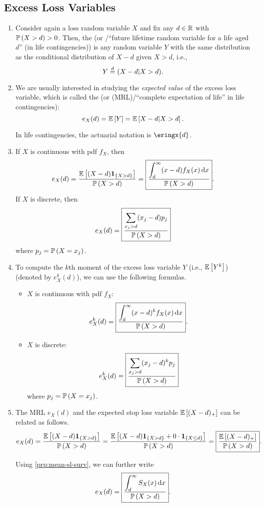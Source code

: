 \subsection{Excess Loss Variables}
\begin{enumerate}
\item Consider again a loss random variable \(X\) and fix any \(d\in\mathbb{R}\) with
\(\mathbb{P}\left(X>d\right)>0\). Then, the  (or /``future lifetime random variable for a life aged \(d\)'' (in life
contingencies)) is any random variable \(Y\) with the same distribution
as the conditional distribution of \(X-d\) given \(X>d\), i.e.,
\[
Y\overset{d}= (X-d|X>d).
\]
\item We are usually interested in studying the \emph{expected value} of the
excess loss variable, which is called the  (or
 (MRL)/``complete expectation of life'' in life
contingencies):
\[
e_{X}(d)=\mathbb{E}\left[Y\right]=\mathbb{E}\left[X-d|X>d\right].
\]
\begin{note}
In life contingencies, the actuarial notation is \(\eringx{d}\).
\end{note}
\item \label{it:mrl-fmlas}
If \(X\) is continuous with pdf \(f_X\), then
\[
e_X(d)=\frac{\mathbb{E}\left[(X-d)\mathbf{1}_{\left\{X>d\right\}}\right]}{\mathbb{P}\left(X>d\right)}
=\boxed{\frac{\displaystyle\int_{d}^{\infty}(x-d)f_X(x)\dd{x}}{\mathbb{P}\left(X>d\right)}}.
\]
If \(X\) is discrete, then
\[
e_X(d)=\boxed{\frac{\displaystyle \sum_{x_j>d}^{}(x_j-d)p_j}{\mathbb{P}\left(X>d\right)}}
\]
where \(p_j=\mathbb{P}\left(X=x_j\right)\).

\item \label{it:ex-loss-kth-moment-fmlas}
To compute the \(k\)th moment of the excess loss variable \(Y\) (i.e.,
\(\mathbb{E}\left[Y^k\right]\)) (denoted by \(e_X^{k}(d)\)), we can use the following formulas.
\begin{itemize}
\item \(X\) is continuous with pdf \(f_X\):
\[
e_X^{k}(d)=\boxed{\frac{\displaystyle \int_{d}^{\infty}(x-d)^kf_X(x)\dd{x}}{\mathbb{P}\left(X>d\right)}}.
\]
\item \(X\) is discrete:
\[
e_X^{k}(d)=\boxed{\frac{\displaystyle \sum_{x_j>d}^{}(x_j-d)^{k}p_j}{\mathbb{P}\left(X>d\right)}}
\]
where \(p_j=\mathbb{P}\left(X=x_j\right)\).
\end{itemize}
\item \label{it:mrl-exp-sl-relation}
The MRL \(e_X(d)\) and the expected stop loss variable \(\mathbb{E}\left[(X-d)_{+}\right]\) can
be related as follows.
\[
e_X(d)=\frac{\mathbb{E}\left[(X-d)\mathbf{1}_{\left\{X>d\right\}}\right]}{\mathbb{P}\left(X>d\right)}
=\frac{\mathbb{E}\left[(X-d)\mathbf{1}_{\left\{X>d\right\}}+0\cdot\mathbf{1}_{\left\{X\le d\right\}}\right]}{\mathbb{P}\left(X>d\right)}
=\boxed{\frac{\mathbb{E}\left[(X-d)_{+}\right]}{\mathbb{P}\left(X>d\right)}}.
\]
\begin{note}
Using \cref{prp:mean-sl-surv}, we can further write
\[
e_X(d)=\boxed{\frac{\displaystyle \int_{d}^{\infty}S_X(x)\dd{x}}{\mathbb{P}\left(X>d\right)}}.
\]
\end{note}
\end{enumerate}
